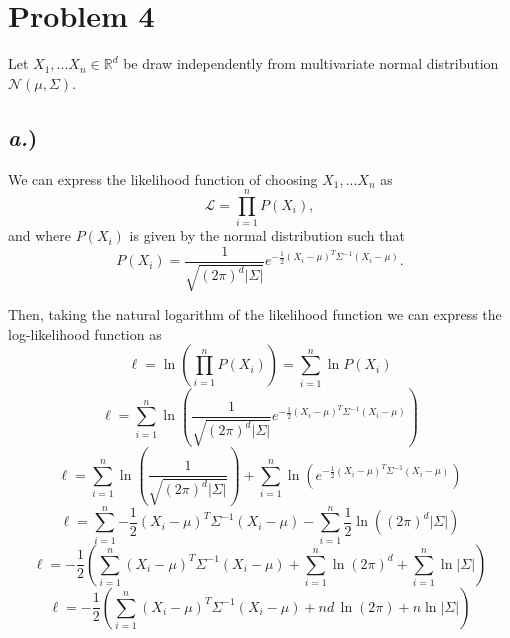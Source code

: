 \documentclass{report}
\begin{document}
\newpage
\section*{Problem 4}

Let $X_1, ... X_n \in \mathbb{R}^{d}$ be draw independently from multivariate normal distribution $\mathcal{N}(\mu,\Sigma)$.

\subsection*{\textit{a.})}

We can express the likelihood function of choosing $X_1,...X_n$ as
$$ \mathcal{L} = \prod_{i=1}^n{P(X_i)}, $$
and where $P(X_i)$ is given by the normal distribution such that
$$ P(X_i) = \frac{1}{\sqrt{(2\pi)^d|\Sigma|}}e^{-\frac{1}{2}(X_i-\mu)^T\Sigma^{-1}(X_i-\mu)}.$$

Then, taking the natural logarithm of the likelihood function we can express the log-likelihood function as
$$ \ell = \ln\left(\prod_{i=1}^n{P(X_i)}\right) = \sum_{i=1}^n{\ln P(X_i)} $$
$$ \ell = \sum_{i=1}^n{\ln \left(\frac{1}{\sqrt{(2\pi)^d|\Sigma|}}e^{-\frac{1}{2}(X_i-\mu)^T\Sigma^{-1}(X_i-\mu)}\right)} $$
$$ \ell = \sum_{i=1}^n{\ln \left(\frac{1}{\sqrt{(2\pi)^d|\Sigma|}}\right)} + \sum_{i=1}^n{\ln \left(e^{-\frac{1}{2}(X_i-\mu)^T\Sigma^{-1}(X_i-\mu)}\right)} $$
$$ \ell = \sum_{i=1}^n{-\frac{1}{2}(X_i-\mu)^T\Sigma^{-1}(X_i-\mu)} - \sum_{i=1}^n{\frac{1}{2} \ln \left((2\pi)^d|\Sigma|\right)} $$
$$ \ell = -\frac{1}{2}\left(\sum_{i=1}^n{(X_i-\mu)^T\Sigma^{-1}(X_i-\mu)} + \sum_{i=1}^n{\ln (2\pi)^d} + \sum_{i=1}^n{\ln |\Sigma|}\right) $$
$$ \ell = -\frac{1}{2}\left(\sum_{i=1}^n{(X_i-\mu)^T\Sigma^{-1}(X_i-\mu)} + nd\,{\ln (2\pi)} + n\ln |\Sigma| \right) $$
\end{document}
